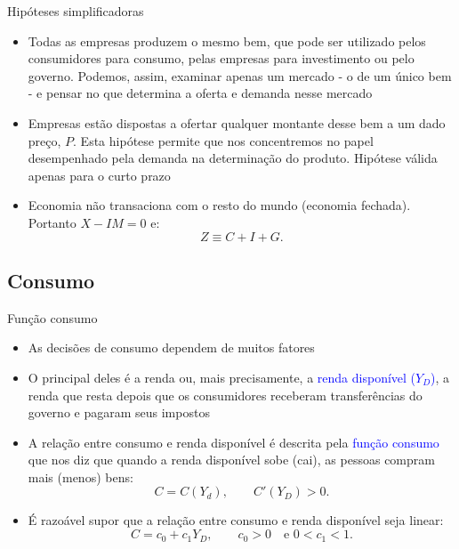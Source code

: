 \documentclass[10pt]{beamer}
\begin{document}
\begin{frame}{Hipóteses simplificadoras}
    \begin{itemize}
        \item Todas as empresas produzem o mesmo bem, que pode ser utilizado pelos consumidores para consumo, pelas empresas para investimento ou pelo governo. Podemos, assim, examinar apenas um mercado - o de um único bem - e pensar no que determina a oferta e demanda nesse mercado\bigskip
         
        \item Empresas estão dispostas a ofertar qualquer montante desse bem a um dado preço, $P$. Esta hipótese permite que nos concentremos no papel desempenhado pela demanda na determinação do produto. Hipótese válida apenas para o curto prazo\bigskip
         
        \item Economia não transaciona com o resto do mundo (economia fechada). Portanto $X - IM = 0$ e:
        \begin{equation}
        Z \equiv C + I + G.
        \end{equation}
    \end{itemize}
\end{frame}

\subsection{Consumo}
\begin{frame}{Função consumo}
    \begin{itemize}
        \item As decisões de consumo dependem de muitos fatores\bigskip
         
        \item O principal deles é a renda ou, mais precisamente, a \textcolor{blue}{renda disponível ($Y_D$)}, a renda que resta depois que os consumidores receberam transferências do governo e pagaram seus impostos\bigskip
         
        \item A relação entre consumo e renda disponível é descrita pela \textcolor{blue}{função consumo} que nos diz que quando a renda disponível sobe (cai), as pessoas compram mais (menos) bens:
        \begin{equation}
            C = C(Y_d), \qquad C'(Y_D) > 0.
        \end{equation}
         
        \item É razoável supor que a relação entre consumo e renda disponível seja linear:
        \begin{equation}
            C = c_0 + c_1Y_D, \qquad c_0>0 \quad \text{e } 0<c_1<1.
            \label{consumo}
        \end{equation}
    \end{itemize}
\end{frame}
\end{document}
